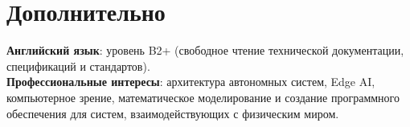 \documentclass[10pt,a4paper]{article}
\begin{document}
\section*{Дополнительно}
\textbf{Английский язык}: уровень B2+ (свободное чтение технической документации, спецификаций и стандартов). \\
\textbf{Профессиональные интересы}: архитектура автономных систем, Edge AI, компьютерное зрение, математическое моделирование и создание программного обеспечения для систем, взаимодействующих с физическим миром.
\end{document}

